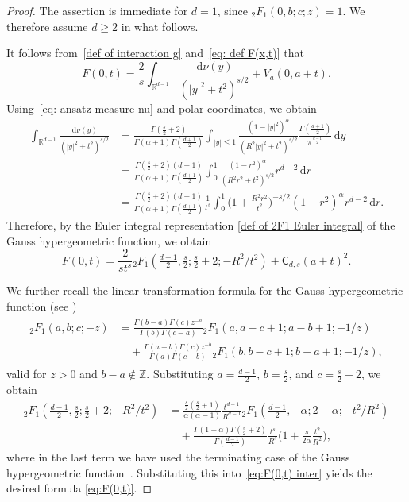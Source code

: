 \documentclass{amsart}
\def\R{\mathbb{R}}
\newcommand{\ud}{\, \mathrm{d}}
\theoremstyle{plain}
\theoremstyle{remark}
\numberwithin{equation}{section}
\begin{document}
\begin{proof}
The assertion is immediate for $d=1$, since
${}_2F_1(0,b;c;z)=1$. We therefore assume $d\ge2$ in what follows.

It follows from~\eqref{def of interaction g} and~\eqref{eq: def F(x,t)}
that 
\begin{equation}
    F(0,t) = \frac{2}{s} \int_{\R^{d-1}} \frac{\ud \nu(y)}{(|y|^2 + t^2)^{s/2}} + V_a(0,a+t).
\end{equation}
Using~\eqref{eq: ansatz measure nu} and polar coordinates, we obtain
\begin{align*}
    \int_{\R^{d-1}}\frac{\ud\nu(y)}{(|y|^2+t^2)^{s/2}} &= \frac{\Gamma(\frac{s}{2}+2)}{\Gamma(\alpha+1)\Gamma(\frac{d+1}{2})}\int_{|y|\le 1} \frac{(1-|y|^2)^\alpha}{(R^2|y|^2+t^2)^{s/2}} \frac{\Gamma(\frac{d+1}{2})}{\pi^{\frac{d-1}{2}}}\ud y\\
    &= \frac{\Gamma(\frac{s}{2}+2)(d-1)}{\Gamma(\alpha+1)\Gamma(\frac{d+1}{2})}\int_0^1 \frac{(1-r^2)^\alpha}{(R^2r^2+t^2)^{s/2}}r^{d-2}\ud r\\
    &= \frac{\Gamma(\frac{s}{2}+2)(d-1)}{\Gamma(\alpha+1)\Gamma(\frac{d+1}{2})}\frac{1}{t^s}\int_0^1 \Big(1+\frac{R^2r^2}{t^2}\Big)^{-s/2} (1-r^2)^\alpha r^{d-2}\ud r.  
\end{align*}
Therefore, by the Euler integral representation \eqref{def of 2F1 Euler integral} of the Gauss hypergeometric
function, we obtain 
\begin{equation}\label{eq:F(0,t) inter}
    F(0,t) =\frac{2}{st^s}{}_2F_1(\tfrac{d-1}{2},\tfrac{s}{2}; \tfrac{s}{2}+2 ;- R^2/t^2) + \mathsf{C}_{d,s} (a+t)^2 .
\end{equation}

We further recall the linear transformation formula for the Gauss
hypergeometric function (see \cite[Eq.~(15.8.2)]{NIST})
\begin{align}
\begin{split}
    {}_2F_1(a,b;c;-z) &= \frac{\Gamma(b-a)\Gamma(c)z^{-a}}{\Gamma(b)\Gamma(c-a)} {}_2F_1(a, a-c+1;a-b+1;-1/z)\\
    &\quad + \frac{\Gamma(a-b)\Gamma(c)z^{-b}}{\Gamma(a)\Gamma(c-b)} {}_2F_1(b,b-c+1; b-a+1; -1/z),
\end{split}
\end{align}
valid for $z>0$ and $b-a\notin\mathbb{Z}$. Substituting $a=\frac{d-1}{2}$, $b=\frac{s}{2}$, and $c=\frac{s}{2}+2$, we obtain
\begin{align*}
    {}_2F_1(\tfrac{d-1}{2},\tfrac{s}{2};\tfrac{s}{2}+2; -R^2/t^2)
    &= \frac{\frac{s}{2}(\frac{s}{2}+1)}{\alpha(\alpha-1)}\frac{t^{d-1}}{R^{d-1}} {}_2F_1(\tfrac{d-1}{2}, -\alpha; 2-\alpha; -t^2/R^2)\\
    &\quad +\frac{\Gamma(1-\alpha)\Gamma(\frac{s}{2}+2)}{\Gamma(\frac{d-1}{2})}\frac{t^s}{R^s}\Big(1+\frac{s}{2\alpha}\frac{t^2}{R^2}\Big),
\end{align*}
where in the last term we have used the terminating case of the Gauss hypergeometric function~\cite[Eq.~(15.2.4)]{NIST}. Substituting this into~\eqref{eq:F(0,t) inter} yields the desired formula \eqref{eq:F(0,t)}. 
\end{proof}
\end{document}
